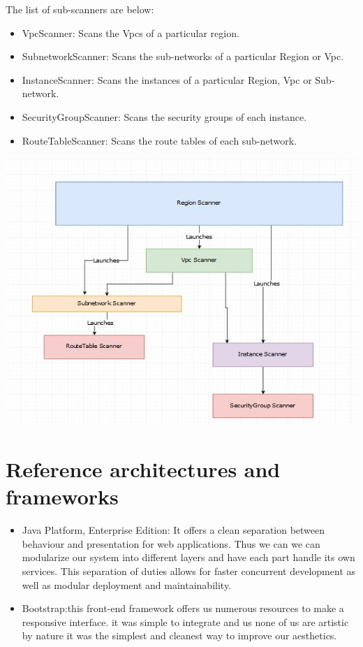 \documentclass[hidelinks,a4paper,12pt]{article}
\begin{document}
The list of sub-scanners are below:
\begin{itemize} 
\item VpcScanner: Scans the Vpcs of a particular region.
\item SubnetworkScanner: Scans the sub-networks of a particular Region or Vpc.
\item InstanceScanner: Scans the instances of a particular Region, Vpc or Sub-network.
\item SecurityGroupScanner: Scans the security groups of each instance.
\item RouteTableScanner: Scans the route tables of each sub-network.
\end{itemize}



\includegraphics[width=1.00\textwidth]{./images/threads.jpg}\\[0.4cm] 


\section{Reference architectures and frameworks }

\begin{itemize} 
\item Java Platform, Enterprise Edition: It offers a clean separation between behaviour and presentation for web applications. Thus we can we can modularize our system into different layers and have each part handle its own services. This separation of duties allows for faster concurrent development as well as modular deployment and maintainability.
\item Bootstrap:this front-end framework offers us numerous resources to make a responsive interface. it was simple to integrate and us none of us are artistic by nature it was the simplest and cleanest way to improve our aesthetics.
\end{itemize}
\end{document}
